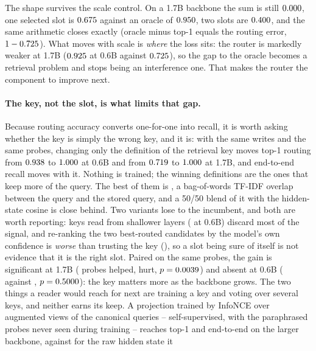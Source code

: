 \documentclass[11pt]{article}
\begin{document}
The shape survives the scale control. On a 1.7B backbone the sum is still
$0.000{}$, one selected slot is $0.675{}$ against an oracle of
$0.950{}$, two slots are $0.400{}$, and the same arithmetic
closes exactly (oracle minus top-1 equals the routing error, $1 -
0.725{}$). What moves with scale is \emph{where} the loss sits: the router
is markedly weaker at 1.7B ($0.925{}$ at 0.6B against $0.725{}$), so
the gap to the oracle becomes a retrieval problem and stops being an interference one.
That makes the router the component to improve next.

\paragraph{The key, not the slot, is what limits that gap.} Because routing accuracy
converts one-for-one into recall, it is worth asking whether the key is simply the wrong
key, and it is: with the same writes and the same probes, changing only the definition
of the retrieval key moves top-1 routing from $0.938{}$ to $1.000{}$ at
0.6B and from $0.719{}$ to $1.000{}$ at 1.7B, and end-to-end
recall moves with it. Nothing is trained; the winning definitions are the ones that keep
more of the query. The best of them is \tKeyBest{}, a bag-of-words TF-IDF overlap
between the query and the stored query, and a 50/50 blend of it with the hidden-state
cosine is close behind. Two variants lose to the incumbent, and both are worth
reporting: keys read from shallower layers (\tKeyShallowTop{} at 0.6B) discard most of
the signal, and re-ranking the two best-routed candidates by the model's own confidence
is \emph{worse} than trusting the key (\tKeyEntropyTop{}), so a slot being sure of
itself is not evidence that it is the right slot. Paired on the same probes, the gain is
significant at 1.7B (\tKeyPairHelpedLarge{} probes helped, \tKeyPairHurtLarge{} hurt,
$p = 0.0039{}$) and absent at 0.6B (\tKeyPairHelpedSmall{} against
\tKeyPairHurtSmall{}, $p = 0.5000{}$): the key matters more as the backbone
grows. The two things a reader would reach for next are training a key and voting over
several keys, and neither earns its keep. A projection trained by InfoNCE over augmented
views of the canonical queries -- self-supervised, with the paraphrased probes never seen
during training -- reaches \tKeyLearnedTopLarge{} top-1 and \tKeyLearnedEmLarge{}
end-to-end on the larger backbone, against \tKeyLastTopLarge{} for the raw hidden state it
\end{document}
